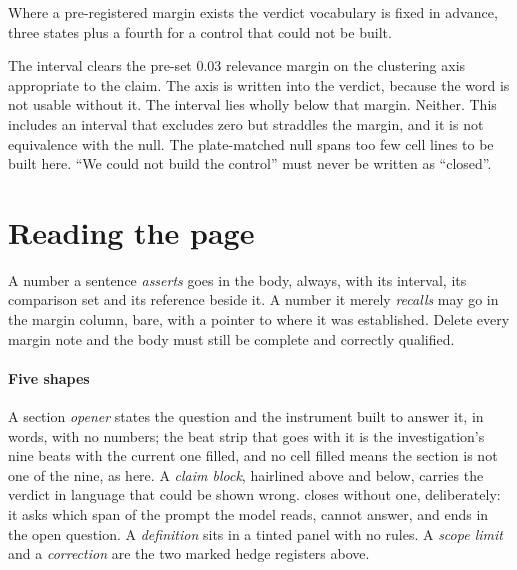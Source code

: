 Where a pre-registered margin exists the verdict vocabulary is fixed in advance,
three states plus a fourth for a control that could not be built.

\begin{description}[leftmargin=1em, itemsep=0.5ex,
                    font=\normalfont\bfseries]
 The interval clears the pre-set $0.03$ relevance margin on
  the clustering axis appropriate to the claim. The axis is written into the
  verdict, because the word is not usable without it.
 The interval lies wholly below that margin.
 Neither. This includes an interval that
  excludes zero but straddles the margin, and it is not equivalence with the
  null.
 The plate-matched null spans too few cell lines
  to be built here. ``We could not build the control'' must never be written as
  ``closed''.
\end{description}

\section*{Reading the page}

\noindent
A number a sentence \emph{asserts} goes in the body, always, with its interval,
its comparison set and its reference beside it. A number it merely
\emph{recalls} may go in the margin column, bare, with a pointer to where it was
established. Delete every margin note and the body must
still be complete and correctly qualified.

\paragraph{Five shapes} A section \emph{opener} states the question and the
instrument built to answer it, in words, with no numbers; the beat strip that
goes with it is the investigation's nine beats with the current one filled, and
no cell filled means the section is not one of the nine, as here. A \emph{claim
block}, hairlined above and below, carries the verdict in language that could be
shown wrong.  closes without one, deliberately: it asks which span
of the prompt the model reads, cannot answer, and ends in the open question. A
\emph{definition} sits in a tinted panel with no rules. A \emph{scope limit} and
a \emph{correction} are the two marked hedge registers above.

